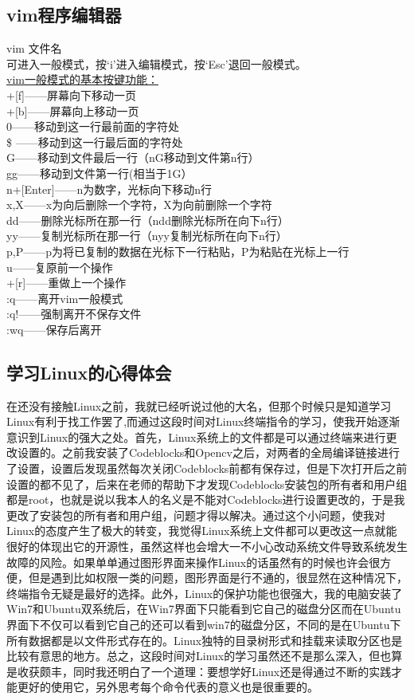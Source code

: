 \documentclass[12pt]{article}
\begin{document}
\begin{flushleft}
\begin{flushleft}
\begin{flushleft}
\begin{flushleft}
\subsection{vim程序编辑器}
\begin{flushleft}
vim 文件名\\
可进入一般模式，按`i'进入编辑模式，按`Esc'退回一般模式。\\
\underline{vim一般模式的基本按键功能：}\\
[Ctrl]+[f]——屏幕向下移动一页\\
[Ctrl]+[b]——屏幕向上移动一页\\
0——移动到这一行最前面的字符处\\
\${} ——移动到这一行最后面的字符处\\
G——移动到文件最后一行（nG移动到文件第n行）\\
gg——移动到文件第一行(相当于1G）\\
n+[Enter]——n为数字，光标向下移动n行\\
x,X——x为向后删除一个字符，X为向前删除一个字符\\
dd——删除光标所在那一行（ndd删除光标所在向下n行）\\
yy——复制光标所在那一行（nyy复制光标所在向下n行）\\
p,P——p为将已复制的数据在光标下一行粘贴，P为粘贴在光标上一行\\
u——复原前一个操作\\
[Ctrl]+[r]——重做上一个操作\\
:q——离开vim一般模式\\
:q!——强制离开不保存文件\\
:wq——保存后离开
\end{flushleft}
\subsection{学习Linux的心得体会}
在还没有接触Linux之前，我就已经听说过他的大名，但那个时候只是知道学习Linux有利于找工作罢了,而通过这段时间对Linux终端指令的学习，使我开始逐渐意识到Linux的强大之处。首先，Linux系统上的文件都是可以通过终端来进行更改设置的。之前我安装了Codeblocks和Opencv之后，对两者的全局编译链接进行了设置，设置后发现虽然每次关闭Codeblocks前都有保存过，但是下次打开后之前设置的都不见了，后来在老师的帮助下才发现Codeblocks安装包的所有者和用户组都是root，也就是说以我本人的名义是不能对Codeblocks进行设置更改的，于是我更改了安装包的所有者和用户组，问题才得以解决。通过这个小问题，使我对Linux的态度产生了极大的转变，我觉得Linux系统上文件都可以更改这一点就能很好的体现出它的开源性，虽然这样也会增大一不小心改动系统文件导致系统发生故障的风险。如果单单通过图形界面来操作Linux的话虽然有的时候也许会很方便，但是遇到比如权限一类的问题，图形界面是行不通的，很显然在这种情况下，终端指令无疑是最好的选择。此外，Linux的保护功能也很强大，我的电脑安装了Win7和Ubuntu双系统后，在Win7界面下只能看到它自己的磁盘分区而在Ubuntu界面下不仅可以看到它自己的还可以看到win7的磁盘分区，不同的是在Ubuntu下所有数据都是以文件形式存在的。Linux独特的目录树形式和挂载来读取分区也是比较有意思的地方。总之，这段时间对Linux的学习虽然还不是那么深入，但也算是收获颇丰，同时我还明白了一个道理：要想学好Linux还是得通过不断的实践才能更好的使用它，另外思考每个命令代表的意义也是很重要的。

\end{flushleft}
\end{flushleft}
\end{flushleft}
\end{flushleft}
\end{document}
